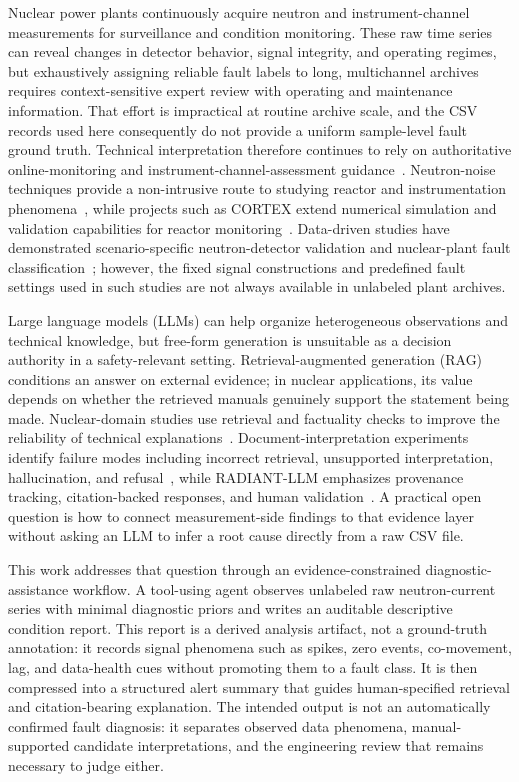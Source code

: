 Nuclear power plants continuously acquire neutron and instrument-channel measurements for surveillance and condition monitoring. These raw time series can reveal changes in detector behavior, signal integrity, and operating regimes, but exhaustively assigning reliable fault labels to long, multichannel archives requires context-sensitive expert review with operating and maintenance information. That effort is impractical at routine archive scale, and the CSV records used here consequently do not provide a uniform sample-level fault ground truth. Technical interpretation therefore continues to rely on authoritative online-monitoring and instrument-channel-assessment guidance~\citep{iaea2008olm1,iaea2008olm2,hashemian2011online}. Neutron-noise techniques provide a non-intrusive route to studying reactor and instrumentation phenomena~\citep{pazsit2010noise}, while projects such as CORTEX extend numerical simulation and validation capabilities for reactor monitoring~\citep{demaziere2022cortex}. Data-driven studies have demonstrated scenario-specific neutron-detector validation and nuclear-plant fault classification~\citep{tambouratzis2020neutron,elbordany2024fault}; however, the fixed signal constructions and predefined fault settings used in such studies are not always available in unlabeled plant archives.

Large language models (LLMs) can help organize heterogeneous observations and technical knowledge, but free-form generation is unsuitable as a decision authority in a safety-relevant setting. Retrieval-augmented generation (RAG)~\citep{lewis2020rag} conditions an answer on external evidence; in nuclear applications, its value depends on whether the retrieved manuals genuinely support the statement being made. Nuclear-domain studies use retrieval and factuality checks to improve the reliability of technical explanations~\citep{reeves2024reliability,lin2025cws}. Document-interpretation experiments identify failure modes including incorrect retrieval, unsupported interpretation, hallucination, and refusal~\citep{mapes2025uprate}, while RADIANT-LLM emphasizes provenance tracking, citation-backed responses, and human validation~\citep{ndum2026radiant}. A practical open question is how to connect measurement-side findings to that evidence layer without asking an LLM to infer a root cause directly from a raw CSV file.

This work addresses that question through an evidence-constrained diagnostic-assistance workflow. A tool-using agent observes unlabeled raw neutron-current series with minimal diagnostic priors and writes an auditable descriptive condition report. This report is a derived analysis artifact, not a ground-truth annotation: it records signal phenomena such as spikes, zero events, co-movement, lag, and data-health cues without promoting them to a fault class. It is then compressed into a structured alert summary that guides human-specified retrieval and citation-bearing explanation. The intended output is not an automatically confirmed fault diagnosis: it separates observed data phenomena, manual-supported candidate interpretations, and the engineering review that remains necessary to judge either.

